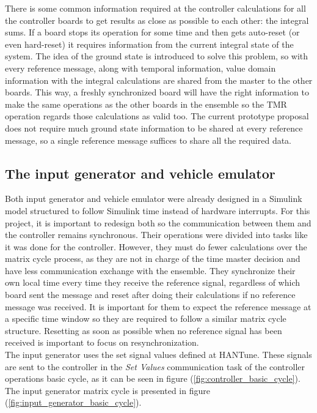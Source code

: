 \documentclass[table,xcdraw]{article}
\begin{document}
There is some common information required at the controller calculations for all the controller boards to get results as close as possible to each other: the integral sums. If a board stops its operation for some time and then gets auto-reset (or even hard-reset) it requires information from the current integral state of the system. The idea of the ground state is introduced to solve this problem, so with every reference message, along with temporal information, value domain information with the integral calculations are shared from the master to the other boards. This way, a freshly synchronized board will have the right information to make the same operations as the other boards in the ensemble so the TMR operation regards those calculations as valid too. The current prototype proposal does not require much ground state information to be shared at every reference message, so a single reference message suffices to share all the required data.


\subsection{The input generator and vehicle emulator}\label{sec:inputgen_vehicleem}
Both input generator and vehicle emulator were already designed in a Simulink model structured to follow Simulink time instead of hardware interrupts. For this project, it is important to redesign both so the communication between them and the controller remains synchronous. Their operations were divided into tasks like it was done for the controller. However, they must do fewer calculations over the matrix cycle process, as they are not in charge of the time master decision and have less communication exchange with the ensemble. They synchronize their own local time every time they receive the reference signal, regardless of which board sent the message and reset after doing their calculations if no reference message was received. It is important for them to expect the reference message at a specific time window so they are required to follow a similar matrix cycle structure. Resetting as soon as possible when no reference signal has been received is important to focus on resynchronization.\\

The input generator uses the set signal values defined at HANTune. These signals are sent to the controller in the \textit{Set Values} communication task of the controller operations basic cycle, as it can be seen in figure (\ref{fig:controller_basic_cycle}). The input generator matrix cycle is presented in figure (\ref{fig:input_generator_basic_cycle}).\\
\end{document}
